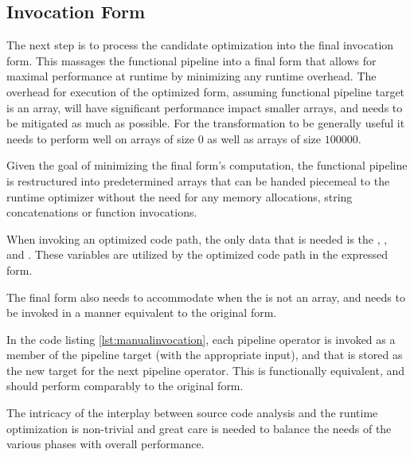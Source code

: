 \subsection{Invocation Form}
The next step is to process the candidate optimization into the final invocation form.  This massages the functional pipeline into a final form that allows for maximal performance at runtime by minimizing any runtime overhead.  The overhead for execution of the optimized form, assuming functional pipeline target is an array, will have significant performance impact smaller arrays, and needs to be mitigated as much as possible.  For the transformation to be generally useful it needs to perform well on arrays of size $0$ as well as arrays of size $100000$.  

\begin{minipage}{\linewidth}

\end{minipage}

Given the goal of minimizing the final form's computation, the functional pipeline is restructured into predetermined arrays that can be handed piecemeal to the runtime optimizer without the need for any memory allocations, string concatenations or function invocations.

When invoking an optimized code path, the only data that is needed is the , ,  and .  These variables are utilized by the optimized code path in the expressed form. 

The final form also needs to accommodate when the  is not an array, and needs to be invoked in a manner equivalent to the original form.  \\

\begin{minipage}{\linewidth}

\end{minipage}

In the code listing \ref{lst:manualinvocation}, each pipeline operator is invoked as a member of the pipeline target (with the appropriate input), and that is stored as the new target for the next pipeline operator.  This is functionally equivalent, and should perform comparably to the original form. 




The intricacy of the interplay between source code analysis and the runtime optimization is non-trivial and great care is needed to balance the needs of the various phases with overall performance.  
